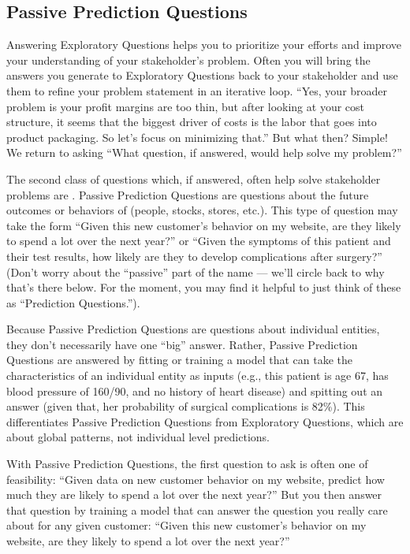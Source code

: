 \documentclass[letterpaper,10pt,english]{jupyterBook}
\begin{document}
\subsection{Passive Prediction Questions}
\label{\detokenize{10_introduction/22_question_types:passive-prediction-questions}}
\sphinxAtStartPar
Answering Exploratory Questions helps you to prioritize your efforts and improve your understanding of your stakeholder’s problem. Often you will bring the answers you generate to Exploratory Questions back to your stakeholder and use them to refine your problem statement in an iterative loop. “Yes, your broader problem is your profit margins are too thin, but after looking at your cost structure, it seems that the biggest driver of costs is the labor that goes into product packaging. So let’s focus on minimizing that.” But what then? Simple! We return to asking “What question, if answered, would help solve my problem?”

\sphinxAtStartPar
The second class of questions which, if answered, often help solve stakeholder problems are . Passive Prediction Questions are questions about the future outcomes or behaviors of  (people, stocks, stores, etc.). This type of question may take the form “Given this new customer’s behavior on my website, are they likely to spend a lot over the next year?” or “Given the symptoms of this patient and their test results, how likely are they to develop complications after surgery?”  (Don’t worry about the “passive” part of the name — we’ll circle back to why that’s there below. For the moment, you may find it helpful to just think of these as “Prediction Questions.”).

\sphinxAtStartPar
Because Passive Prediction Questions are questions about individual entities, they don’t necessarily have one “big” answer. Rather, Passive Prediction Questions are answered by fitting or training a model that can take the characteristics of an individual entity as inputs (e.g., this patient is age 67, has blood pressure of 160/90, and no history of heart disease) and spitting out an answer  (given that, her probability of surgical complications is 82\%). This differentiates Passive Prediction Questions from Exploratory Questions, which are about global patterns, not individual level predictions.

\sphinxAtStartPar
With Passive Prediction Questions, the first question to ask is often one of feasibility: “Given data on new customer behavior on my website,  predict how much they are likely to spend a lot over the next year?” But you then answer that question by training a model that can answer the question you really care about for any given customer: “Given this new customer’s behavior on my website, are they likely to spend a lot over the next year?”
\end{document}
